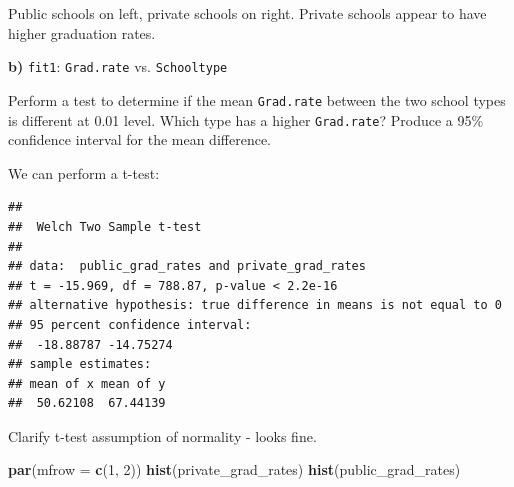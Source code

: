 \documentclass[]{article}
\newenvironment{Shaded}{\begin{snugshade}}{\end{snugshade}}
\newcommand{\KeywordTok}[1]{\textcolor[rgb]{0.13,0.29,0.53}{\textbf{#1}}}
\newcommand{\DataTypeTok}[1]{\textcolor[rgb]{0.13,0.29,0.53}{#1}}
\newcommand{\DecValTok}[1]{\textcolor[rgb]{0.00,0.00,0.81}{#1}}
\newcommand{\StringTok}[1]{\textcolor[rgb]{0.31,0.60,0.02}{#1}}
\newcommand{\CommentTok}[1]{\textcolor[rgb]{0.56,0.35,0.01}{\textit{#1}}}
\newcommand{\OperatorTok}[1]{\textcolor[rgb]{0.81,0.36,0.00}{\textbf{#1}}}
\newcommand{\NormalTok}[1]{#1}
\begin{document}
Public schools on left, private schools on right. Private schools appear
to have higher graduation rates.

\textbf{b)} \texttt{fit1}: \texttt{Grad.rate} vs. \texttt{Schooltype}

Perform a test to determine if the mean \texttt{Grad.rate} between the
two school types is different at 0.01 level. Which type has a higher
\texttt{Grad.rate}? Produce a 95\% confidence interval for the mean
difference.

We can perform a t-test:

\begin{Shaded}
\end{Shaded}

\begin{verbatim}
## 
##  Welch Two Sample t-test
## 
## data:  public_grad_rates and private_grad_rates
## t = -15.969, df = 788.87, p-value < 2.2e-16
## alternative hypothesis: true difference in means is not equal to 0
## 95 percent confidence interval:
##  -18.88787 -14.75274
## sample estimates:
## mean of x mean of y 
##  50.62108  67.44139
\end{verbatim}

Clarify t-test assumption of normality - looks fine.

\begin{Shaded}
\begin{Highlighting}[]
\KeywordTok{par}\NormalTok{(}\DataTypeTok{mfrow =} \KeywordTok{c}\NormalTok{(}\DecValTok{1}\NormalTok{, }\DecValTok{2}\NormalTok{))}
\KeywordTok{hist}\NormalTok{(private_grad_rates)}
\KeywordTok{hist}\NormalTok{(public_grad_rates)}
\end{Highlighting}
\end{Shaded}
\end{document}
